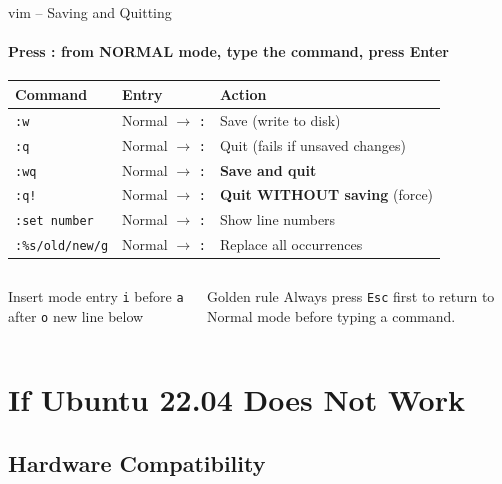 \documentclass[aspectratio=169]{beamer}
\begin{document}
\begin{frame}{vim -- Saving and Quitting}
  \framesubtitle{Press : from NORMAL mode, type the command, press Enter}
  \begin{table}
    \begin{tabularx}{\textwidth}{llX}
      \textbf{Command} & \textbf{Entry} & \textbf{Action} \\
      \toprule
      \texttt{:w}             & Normal $\rightarrow$ \texttt{:}
        & Save (write to disk) \\
      \texttt{:q}             & Normal $\rightarrow$ \texttt{:}
        & Quit (fails if unsaved changes) \\
      \texttt{:wq}            & Normal $\rightarrow$ \texttt{:}
        & \textbf{Save and quit} \\
      \texttt{:q!}            & Normal $\rightarrow$ \texttt{:}
        & \textbf{Quit WITHOUT saving} (force) \\
      \texttt{:set number}    & Normal $\rightarrow$ \texttt{:}
        & Show line numbers \\
      \texttt{:\%s/old/new/g} & Normal $\rightarrow$ \texttt{:}
        & Replace all occurrences \\
      \bottomrule
    \end{tabularx}
  \end{table}
  \vspace{0.3em}
  \begin{columns}
      \begin{exampleblock}{Insert mode entry}
        \texttt{i} before \quad \texttt{a} after \quad
        \texttt{o} new line below
      \end{exampleblock}
      \begin{alertblock}{Golden rule}
        Always press \texttt{Esc} first to return
        to Normal mode before typing a command.
      \end{alertblock}
  \end{columns}
\end{frame}

\section{If Ubuntu 22.04 Does Not Work}
\subsection{Hardware Compatibility}
\end{document}
